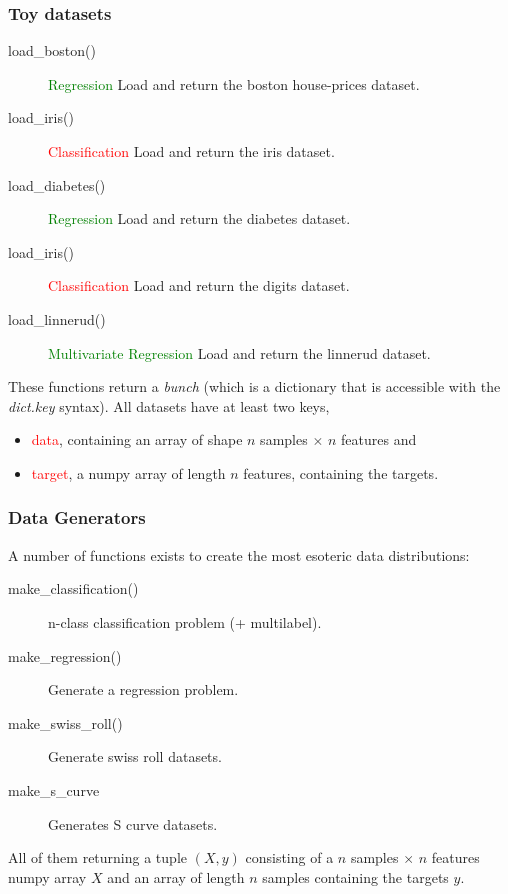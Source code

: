 \documentclass[10pt, colorlinks]{beamer}
\begin{document}
\begin{frame}[fragile]\frametitle{Toy datasets}
\begin{description}
    \item[load\_boston()] \textcolor{green}{Regression} Load and return the boston house-prices dataset.
    \item[load\_iris()] \textcolor{red}{Classification} Load and return the iris dataset.
    \item[load\_diabetes()] \textcolor{green}{Regression} Load and return the diabetes dataset.
    \item[load\_iris()] \textcolor{red}{Classification} Load and return the digits dataset.
     \item[load\_linnerud()] \textcolor{green}{Multivariate Regression} 	Load and return the linnerud dataset.
\end{description}
These functions return a \emph{bunch} (which is a dictionary that is accessible with the \emph{dict.key} syntax). All datasets have at least two keys, 
\begin{itemize}
    \item \textcolor{red}{data}, containing an array of shape $n$ samples $\times$ $n$ features and 
    \item \textcolor{red}{target}, a numpy array of length $n$ features, containing the targets.
\end{itemize}
\end{frame}

\begin{frame}[fragile]\frametitle{Data Generators}
A number of functions exists to create the most esoteric data distributions: 
\begin{description}
    \item[make\_classification()] n-class classification problem (+ multilabel).
    \item[make\_regression()] Generate a regression problem.
    \item[make\_swiss\_roll()] Generate swiss roll datasets.
    \item[make\_s\_curve]  Generates S curve datasets.
\end{description}
All of them returning a tuple $(X, y)$ consisting of a $n$ samples $\times$ $n$ features numpy array $X$ and an array of length $n$ samples containing the targets $y$.

\end{frame}
\end{document}
